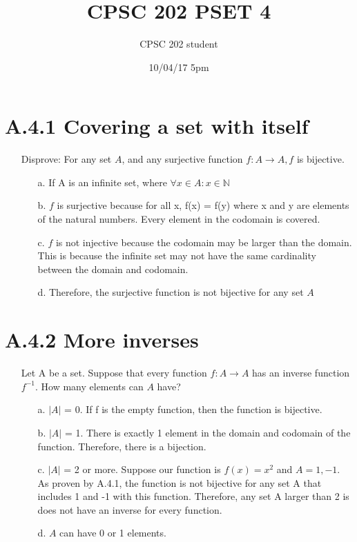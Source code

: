 \documentclass[12pt]{article}
\title{CPSC 202 PSET 4}
\author{CPSC 202 student}
\date{10/04/17 5pm}
\begin{document}
\maketitle

\newcommand{\E}{\mathrm{E}}
\newcommand{\Var}{\mathrm{Var}}
\newcommand{\Cov}{\mathrm{Cov}}

\section*{A.4.1 Covering a set with itself}
\begin{enumerate}
  \item[] Disprove: For any set ${A}$, and any surjective function ${f: A \rightarrow A, f}$ is bijective. 
    \begin{enumerate}
      \item[a.] If A is an infinite set, where ${\forall x \in A : x \in \mathbb{N}}$
      \item[b.] $f$ is surjective because for all x, f(x) = f(y) where x and y are elements of the natural numbers. Every element in the codomain is covered.
      \item[c.] $f$ is not injective because the codomain may be larger than the domain. This is because the infinite set may not have the same cardinality between the domain and codomain. 
      \item[d.] Therefore, the surjective function is not bijective for any set $A$
    \end{enumerate}
\end{enumerate}

\section*{A.4.2 More inverses}
\begin{enumerate}
  \item[] Let A be a set. Suppose that every function ${f: A \rightarrow A}$ has an inverse function ${f^{-1}}$. How many elements can ${A}$ have?
    \begin{enumerate}
      \item[a.] ${|A|}$ = 0. If f is the empty function, then the function is bijective.
      \item[b.] ${|A|}$ = 1. There is exactly 1 element in the domain and codomain of the function. Therefore, there is a bijection.
      \item[c.] ${|A|}$ = 2 or more. Suppose our function is ${f(x) = x^2}$ and ${A = {1, -1}}$. As proven by A.4.1, the function is not bijective for any set A that includes 1 and -1 with this function. Therefore, any set A larger than 2 is does not have an inverse for every function.
      \item[d.] $A$ can have 0 or 1 elements.
    \end{enumerate}
\end{enumerate}
\end{document}
